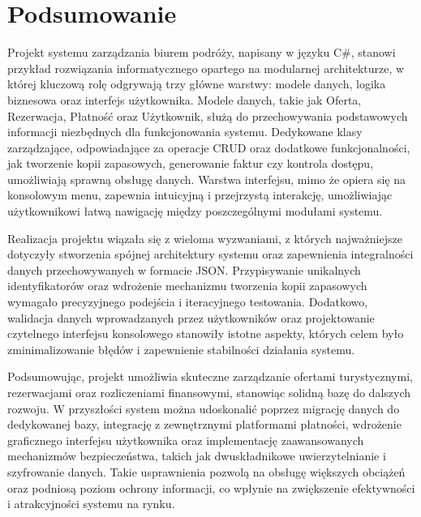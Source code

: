 ﻿%
\chapter{Podsumowanie}

Projekt systemu zarządzania biurem podróży, napisany w języku C\#, stanowi przykład rozwiązania informatycznego opartego na modularnej architekturze, w której kluczową rolę odgrywają trzy główne warstwy: modele danych, logika biznesowa oraz interfejs użytkownika. Modele danych, takie jak Oferta, Rezerwacja, Płatność oraz Użytkownik, służą do przechowywania podstawowych informacji niezbędnych dla funkcjonowania systemu. Dedykowane klasy zarządzające, odpowiadające za operacje CRUD oraz dodatkowe funkcjonalności, jak tworzenie kopii zapasowych, generowanie faktur czy kontrola dostępu, umożliwiają sprawną obsługę danych. Warstwa interfejsu, mimo że opiera się na konsolowym menu, zapewnia intuicyjną i przejrzystą interakcję, umożliwiając użytkownikowi łatwą nawigację między poszczególnymi modułami systemu.

Realizacja projektu wiązała się z wieloma wyzwaniami, z których najważniejsze dotyczyły stworzenia spójnej architektury systemu oraz zapewnienia integralności danych przechowywanych w formacie JSON. Przypisywanie unikalnych identyfikatorów oraz wdrożenie mechanizmu tworzenia kopii zapasowych wymagało precyzyjnego podejścia i iteracyjnego testowania. Dodatkowo, walidacja danych wprowadzanych przez użytkowników oraz projektowanie czytelnego interfejsu konsolowego stanowiły istotne aspekty, których celem było zminimalizowanie błędów i zapewnienie stabilności działania systemu.

Podsumowując, projekt umożliwia skuteczne zarządzanie ofertami turystycznymi, rezerwacjami oraz rozliczeniami finansowymi, stanowiąc solidną bazę do dalszych rozwoju. W przyszłości system można udoskonalić poprzez migrację danych do dedykowanej bazy, integrację z zewnętrznymi platformami płatności, wdrożenie graficznego interfejsu użytkownika oraz implementację zaawansowanych mechanizmów bezpieczeństwa, takich jak dwuskładnikowe uwierzytelnianie i szyfrowanie danych. Takie usprawnienia pozwolą na obsługę większych obciążeń oraz podniosą poziom ochrony informacji, co wpłynie na zwiększenie efektywności i atrakcyjności systemu na rynku.



